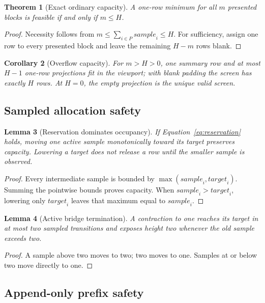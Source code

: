 \documentclass[11pt]{article}
\newtheorem{theorem}{Theorem}[section]
\newtheorem{lemma}[theorem]{Lemma}
\newtheorem{corollary}[theorem]{Corollary}
\theoremstyle{definition}
\newcommand{\alloc}{\mathit{sample}}
\newcommand{\target}{\mathit{target}}
\begin{document}
\begin{theorem}[Exact ordinary capacity]
\label{thm:capacity}
A one-row minimum for all $m$ presented blocks is feasible if and only if
$m\leq H$.
\end{theorem}

\begin{proof}
Necessity follows from
$m\leq\sum_{i\in P}\alloc_i\leq H$.
For sufficiency, assign one row to every presented block and leave the remaining
$H-m$ rows blank.
\end{proof}

\begin{corollary}[Overflow capacity]
For $m>H>0$, one summary row and at most $H-1$ one-row projections fit in the
viewport; with blank padding the screen has exactly $H$ rows.  At $H=0$, the
empty projection is the unique valid screen.
\end{corollary}

\subsection{Sampled allocation safety}

\begin{lemma}[Reservation dominates occupancy]
\label{lem:reservation}
If Equation~\eqref{eq:reservation} holds, moving one active sample monotonically
toward its target preserves capacity.  Lowering a target does not release a row
until the smaller sample is observed.
\end{lemma}

\begin{proof}
Every intermediate sample is bounded by
$\max(\alloc_i,\target_i)$.  Summing the pointwise bounds proves capacity.
When $\alloc_i>\target_i$, lowering only $\target_i$ leaves that maximum equal
to $\alloc_i$.
\end{proof}

\begin{lemma}[Active bridge termination]
A contraction to one reaches its target in at most two sampled transitions and
exposes height two whenever the old sample exceeds two.
\end{lemma}

\begin{proof}
A sample above two moves to two; two moves to one.  Samples at or below two move
directly to one.
\end{proof}

\subsection{Append-only prefix safety}
\end{document}
